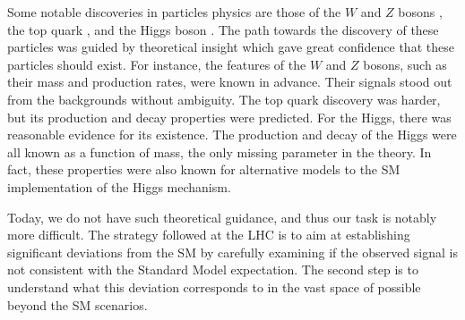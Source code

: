 Some notable discoveries in particles physics are those of the 
$W$ and $Z$ bosons \cite{Arnison:1984qu,Bagnaia:1983zx}, the top quark  
\cite{PhysRevLett.74.2626,Abachi:1995iq}, and the Higgs boson \cite{atlas_higgs, cms_higgs}.
The path towards the discovery of these particles was guided by 
theoretical insight which gave great confidence that these particles 
should exist. 
For instance, the features of the $W$ and $Z$ bosons, such as their mass 
and production rates, were known in advance. 
Their signals stood out from the backgrounds without ambiguity.
The top quark discovery was harder, but its production and decay 
properties were predicted.
For the Higgs, there was reasonable evidence for its existence.
The production and decay of the Higgs were all known as a function of 
mass, the only missing parameter in the theory. 
In fact, these properties were also known for alternative models 
to the SM implementation of the Higgs mechanism.

Today, we do not have such theoretical guidance, and thus our task 
is notably more difficult.
The strategy followed at the LHC is to aim at establishing 
significant deviations from the SM by carefully examining 
if the observed signal is not consistent with the Standard Model expectation.
The second step is to understand what this deviation corresponds to 
in the vast space of possible beyond the SM scenarios.

